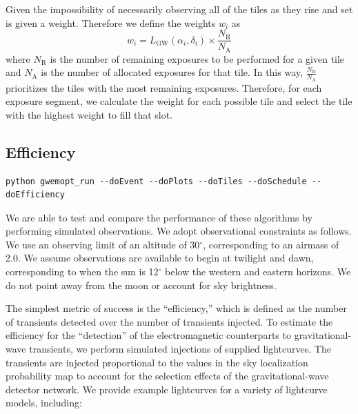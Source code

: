 \documentclass[twocolumn]{aastex62}
\begin{document}
Given the impossibility of necessarily observing all of the tiles as they rise and set 
is given a weight. 
Therefore we define the weights $w_i$ as
\begin{equation}
w_i = L_\textrm{GW}(\alpha_i,\delta_i) \times \frac{N_\textrm{R}}{N_\textrm{A}} 
\end{equation}
where $N_\textrm{R}$ is the number of remaining exposures to be performed for a given tile and $N_\textrm{A}$ is the number of allocated exposures for that tile.
In this way, $\frac{N_\textrm{R}}{N_\textrm{A}}$ prioritizes the tiles with the most remaining exposures.
Therefore, for each exposure segment, we calculate the weight for each possible tile and select the tile with the highest weight to fill that slot.
\subsection{Efficiency}
\label{subsection:efficiency}
\begin{lstlisting}
python gwemopt_run --doEvent --doPlots --doTiles --doSchedule --doEfficiency
\end{lstlisting}
We are able to test and compare the performance of these algorithms by performing simulated observations. 
We adopt observational constraints as follows. 
We use an observing limit of an altitude of 30$^\circ$, corresponding to an airmass of 2.0. 
We assume observations are available to begin at twilight and dawn, corresponding to when the sun is 12$^\circ$ below the western and eastern horizons.
We do not point away from the moon or account for sky brightness.

The simplest metric of success is the ``efficiency,'' which is defined as the number of transients detected over the number of transients injected.
To estimate the efficiency for the ``detection'' of the electromagnetic counterparts to gravitational-wave transients, we perform simulated injections of supplied lightcurves. 
The transients are injected proportional to the values in the sky localization probability map to account for the selection effects of the gravitational-wave detector network.
We provide example lightcurves for a variety of lightcurve models, including:
\end{document}
